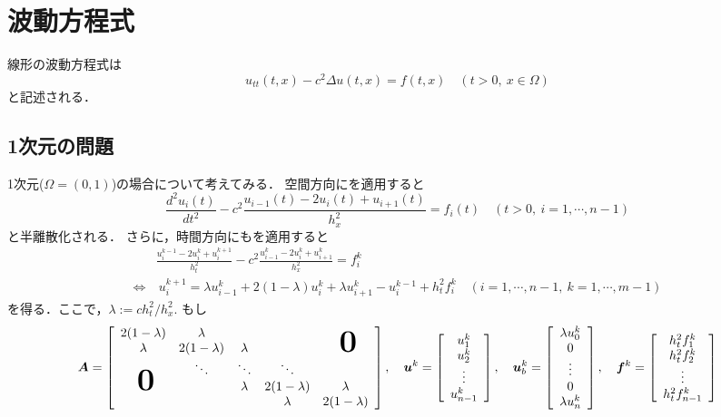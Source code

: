 \section{波動方程式}
線形の波動方程式は
\begin{equation}
\label{e:wave}
u_{tt}(t,x)-c^2\Delta u(t,x)=f(t,x)\quad(t>0,\ x\in\Omega)
\end{equation}
と記述される．


\subsection{ 1次元の問題}
1次元($\Omega=(0,1)$)の場合について考えてみる．
空間方向にを適用すると
$$
\frac{d^2u_i(t)}{dt^2}-c^{2}\frac{u_{i-1}(t)-2u_{i}(t)+u_{i+1}(t)}{h_x^{2}}=f_i(t)\quad(t>0,\ i=1,\cdots,n-1)
$$
と半離散化される．
さらに，時間方向にもを適用すると
\begin{align}
&\frac{u_i^{k-1}-2u_i^k+u_i^{k+1}}{h_t^2}-c^{2}\frac{u_{i-1}^k-2u_{i}^k+u_{i+1}^k}{h_x^{2}}=f_i^k\nonumber\\
\Leftrightarrow&\ u^{k+1}_i=\lambda u^k_{i-1}+2(1-\lambda)u^k_{i}+\lambda u^k_{i+1}-u^{k-1}_i+h_t^2f_i^k\quad(i=1,\cdots,n-1,\ k=1,\cdots,m-1)\label{e:1dwave}
\end{align}
を得る．ここで，$\lambda:=ch_t^2/h_x^2$.
もし
\begin{equation}
\bm{A}=\left[\begin{array}{ccccc}
	2(1-\lambda)&\lambda&&&\\
	\lambda&2(1-\lambda)&\lambda&&\hsymb{\bm{0}}\\
	&\ddots&\ddots&\ddots&\\
	\hsymb{\bm{0}}&&\lambda&2(1-\lambda)&\lambda\\
	&&&\lambda&2(1-\lambda)
	\end{array}\right],\quad
\bm{u}^k=\left[\begin{array}{c}
	u_1^k\\
	u_2^k\\
	\vdots\\
	u_{n-1}^k
	\end{array}\right],\quad
\bm{u}_b^k=\left[\begin{array}{c}
	\lambda u_0^k\\
	0\\
	\vdots\\
	0\\
	\lambda u_{n}^k
	\end{array}\right],\quad
\bm{f}^k=\left[\begin{array}{c}
	h_t^2 f_1^k\\
	h_t^2 f_2^k\\
	\vdots\\
	h_t^2 f_{n-1}^k
	\end{array}\right]	
\end{equation}
